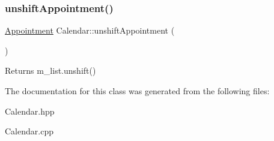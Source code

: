 \subsubsection{\texorpdfstring{unshift\+Appointment()}{unshiftAppointment()}}
{\footnotesize\ttfamily \hyperlink{classAppointment}{Appointment} Calendar\+::unshift\+Appointment (\begin{DoxyParamCaption}{ }\end{DoxyParamCaption})}

\begin{DoxyReturn}{Returns}
m\+\_\+list.\+unshift() 
\end{DoxyReturn}


The documentation for this class was generated from the following files\+:\begin{DoxyCompactItemize}
\item 
Calendar.\+hpp\item 
Calendar.\+cpp\end{DoxyCompactItemize}
